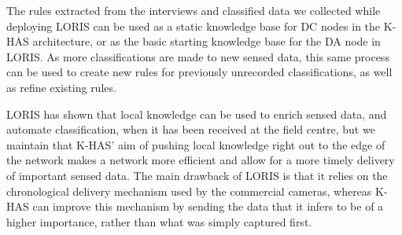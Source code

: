         The rules extracted from the interviews and classified data we collected while deploying LORIS can be used as a static knowledge base for DC nodes in the K-HAS architecture, or as the basic starting knowledge base for the DA node in LORIS. As more classifications are made to new sensed data, this same process can be used to create new rules for previously unrecorded classifications, as well as refine existing rules. 
	
	LORIS has shown that local knowledge can be used to enrich sensed data, and automate classification, when it has been received at the field centre, but we  maintain that K-HAS' aim of pushing local knowledge right out to the edge of the network makes a network more efficient and allow for a more timely delivery of important sensed data.  The main drawback of LORIS is that it relies on the chronological delivery mechanism used by the commercial cameras, whereas K-HAS can improve this mechanism by sending the data that it infers to be of a higher importance, rather than what was simply captured first.